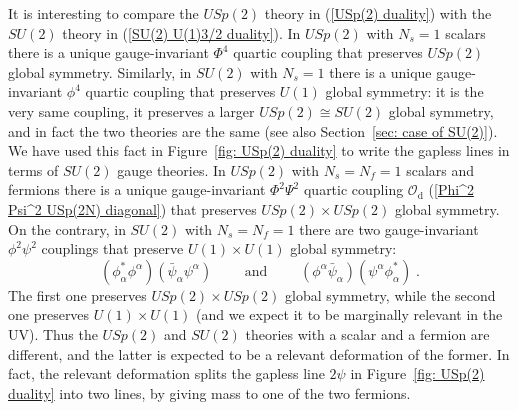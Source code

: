 \documentclass[a4paper, 12pt]{article}
\numberwithin{equation}{section}
\newcommand{\be}{\begin{equation}} \newcommand{\ee}{\end{equation}}
\newcommand{\cO}{\mathcal{O}}
\begin{document}
It is interesting to compare the $USp(2)$ theory in (\ref{USp(2) duality}) with the $SU(2)$ theory in (\ref{SU(2) U(1)3/2 duality}). In $USp(2)$ with $N_s=1$ scalars there is a unique gauge-invariant $\Phi^4$ quartic coupling that preserves $USp(2)$ global symmetry. Similarly, in $SU(2)$ with $N_s=1$ there is a unique gauge-invariant $\phi^4$ quartic coupling that preserves $U(1)$ global symmetry: it is the very same coupling, it preserves a larger $USp(2) \cong SU(2)$ global symmetry, and in fact the two theories are the same (see also Section~\ref{sec: case of SU(2)}). We have used this fact in Figure~\ref{fig: USp(2) duality} to write the gapless lines in terms of $SU(2)$ gauge theories. In $USp(2)$ with $N_s = N_f =1$ scalars and fermions there is a unique gauge-invariant $\Phi^2\Psi^2$ quartic coupling $\cO_\text{d}$ (\ref{Phi^2 Psi^2 USp(2N) diagonal}) that preserves $USp(2) \times USp(2)$ global symmetry. On the contrary, in $SU(2)$ with $N_s = N_f=1$ there are two gauge-invariant $\phi^2\psi^2$ couplings that preserve $U(1) \times U(1)$ global symmetry:
\be
(\phi_\alpha^* \phi^\alpha)(\bar\psi_\alpha \psi^\alpha) \qquad\text{ and }\qquad (\phi^\alpha \bar\psi_\alpha)(\psi^\alpha \phi_\alpha^*) \;.
\ee
The first one preserves $USp(2) \times USp(2)$ global symmetry, while the second one preserves $U(1) \times U(1)$ (and we expect it to be marginally relevant in the UV). Thus the $USp(2)$ and $SU(2)$ theories with a scalar and a fermion are different, and the latter is expected to be a relevant deformation of the former. In fact, the relevant deformation splits the gapless line $2\psi$ in Figure~\ref{fig: USp(2) duality} into two lines, by giving mass to one of the two fermions.
\end{document}
